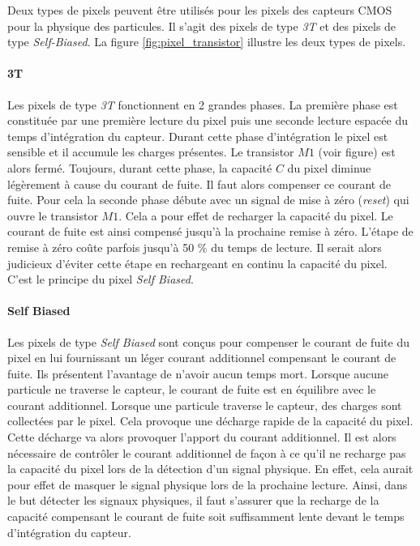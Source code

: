  Deux types de pixels peuvent \^etre utilis\'es pour les pixels des capteurs CMOS pour la physique des particules. Il s'agit des pixels de type \textit{3T} et des pixels de type \textit{Self-Biased}. La figure \ref{fig:pixel_transistor} illustre les deux types de pixels.
  
  \paragraph{3T} Les pixels de type \textit{3T} fonctionnent en 2 grandes phases. La premi\`ere phase est constitu\'ee par une premi\`ere lecture du pixel puis une seconde lecture espac\'ee du temps d'int\'egration du capteur. Durant cette phase d'int\'egration le pixel est sensible et il accumule les charges pr\'esentes. Le transistor $M1$ (voir figure) est alors ferm\'e. Toujours, durant cette phase, la capacit\'e $C$ du pixel diminue l\'eg\`erement \`a cause du courant de fuite. Il faut alors compenser ce courant de fuite. Pour cela la seconde phase d\'ebute avec un signal de mise \`a zéro (\textit{reset}) qui ouvre le transistor $M1$. Cela a pour effet de recharger la capacit\'e du pixel. Le courant de fuite est ainsi compens\'e jusqu'à la prochaine remise \`a z\'ero. L'\'etape de remise \`a z\'ero coûte parfois jusqu'\`a 50 $\%$ du temps de lecture. Il serait alors judicieux d'\'eviter cette \'etape en rechargeant en continu la capacit\'e du pixel. C'est le principe du pixel \textit{Self Biased}.
  
  \paragraph{Self Biased} Les pixels de type \textit{Self Biased} sont con\c{c}us pour compenser le courant de fuite du pixel en lui fournissant un l\'eger courant additionnel compensant le courant de fuite. Ils pr\'esentent l'avantage de n'avoir aucun temps mort. Lorsque aucune particule ne traverse le capteur, le courant de fuite est en \'equilibre avec le courant additionnel. Lorsque une particule traverse le capteur, des charges sont collect\'ees par le pixel. Cela provoque une d\'echarge rapide de la capacit\'e du pixel. Cette d\'echarge va alors provoquer l'apport du courant additionnel. Il est alors n\'ecessaire de contrôler le courant additionnel de fa\c{c}on \`a ce qu'il ne recharge pas la capacit\'e du pixel lors de la d\'etection d'un signal physique. En effet, cela aurait pour effet de masquer le signal physique lors de la prochaine lecture. Ainsi, dans le but d\'etecter les signaux physiques, il faut s'assurer que la recharge de la capacit\'e compensant le courant de fuite soit suffisamment lente devant le temps d'int\'egration du capteur.  
  

